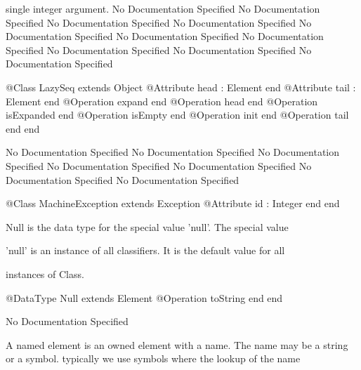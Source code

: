       single integer argument.
No Documentation Specified
No Documentation Specified
No Documentation Specified
No Documentation Specified
No Documentation Specified
No Documentation Specified
No Documentation Specified
No Documentation Specified
No Documentation Specified
No Documentation Specified
\begin{Interface}
@Class LazySeq extends Object
  @Attribute head : Element end
  @Attribute tail : Element end
  @Operation expand end
  @Operation head end
  @Operation isExpanded end
  @Operation isEmpty end
  @Operation init end
  @Operation tail end
end
\end{Interface}
No Documentation Specified
No Documentation Specified
No Documentation Specified
No Documentation Specified
No Documentation Specified
No Documentation Specified
No Documentation Specified
\begin{Interface}
@Class MachineException extends Exception
  @Attribute id : Integer end
end
\end{Interface}

       Null is the data type for the special value 'null'. The special value

       'null' is an instance of all classifiers. It is the default value for all

       instances of Class.
\begin{Interface}
@DataType Null extends Element
  @Operation toString end
end
\end{Interface}
No Documentation Specified

      A named element is an owned element with a name. The name may be a 
      string or a symbol. typically we use symbols where the lookup of the name

